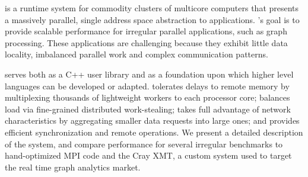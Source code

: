 \Grappa is a runtime system for commodity clusters of multicore computers that
presents a massively parallel, single address space abstraction to
applications. \Grappa's goal is to provide scalable performance for irregular
parallel applications, such as graph processing. These applications are
challenging because they exhibit little data locality, imbalanced parallel
work and complex communication patterns.

\Grappa serves both as a C++ user library and as a foundation upon which
higher level languages can be developed or adapted. \Grappa tolerates delays
to remote memory by multiplexing thousands of lightweight workers
to each processor core; balances load via fine-grained distributed
work-stealing; takes full advantage of network characteristics by aggregating
smaller data requests into large ones; and provides efficient synchronization
and remote operations. We present a detailed description of the \Grappa
system,
and compare
performance for several irregular benchmarks to hand-optimized MPI code and
the Cray XMT, a custom system used to target the real time graph analytics
market.
